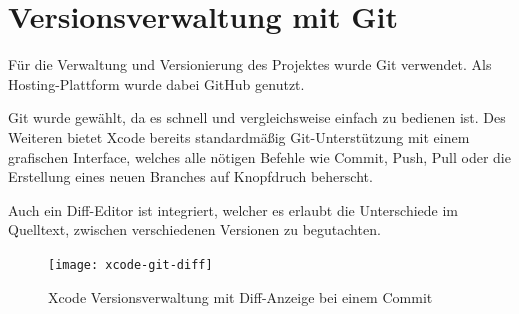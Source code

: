 \section{Versionsverwaltung mit Git}
\label{sec:tools:git}
Für die Verwaltung und Versionierung des Projektes wurde Git verwendet. Als Hosting-Plattform wurde dabei GitHub genutzt.

Git wurde gewählt, da es schnell und vergleichsweise einfach zu bedienen ist. Des Weiteren bietet Xcode bereits standardmäßig Git-Unterstützung mit einem grafischen Interface, welches alle nötigen Befehle wie Commit, Push, Pull oder die Erstellung eines neuen Branches auf Knopfdruch beherscht.

Auch ein Diff-Editor ist integriert, welcher es erlaubt die Unterschiede im Quelltext, zwischen verschiedenen Versionen zu begutachten.

\begin{figure}[htb!]
		  \centering
	\texttt{[image: xcode-git-diff]}
	\caption{Xcode Versionsverwaltung mit Diff-Anzeige bei einem Commit}
	\label{xcode-git-diff}
\end{figure}


